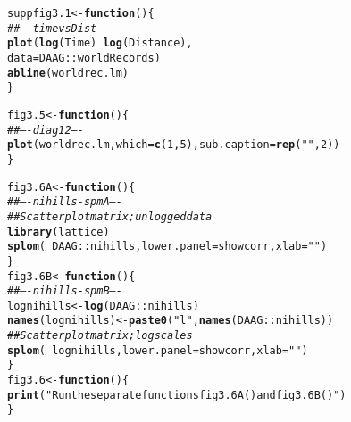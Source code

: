\documentclass[12pt, a4paper,  BCOR=8.25mm, DIV=15]{scrartcl}\usepackage[]{graphicx}\usepackage[]{color}
\makeatletter
\newcommand{\hlnum}[1]{\textcolor[rgb]{0.686,0.059,0.569}{#1}}%
\newcommand{\hlstr}[1]{\textcolor[rgb]{0.192,0.494,0.8}{#1}}%
\newcommand{\hlcom}[1]{\textcolor[rgb]{0.678,0.584,0.686}{\textit{#1}}}%
\newcommand{\hlopt}[1]{\textcolor[rgb]{0,0,0}{#1}}%
\newcommand{\hlstd}[1]{\textcolor[rgb]{0.345,0.345,0.345}{#1}}%
\newcommand{\hlkwa}[1]{\textcolor[rgb]{0.161,0.373,0.58}{\textbf{#1}}}%
\newcommand{\hlkwb}[1]{\textcolor[rgb]{0.69,0.353,0.396}{#1}}%
\newcommand{\hlkwc}[1]{\textcolor[rgb]{0.333,0.667,0.333}{#1}}%
\newcommand{\hlkwd}[1]{\textcolor[rgb]{0.737,0.353,0.396}{\textbf{#1}}}%
\newenvironment{kframe}{%
 \def\at@end@of@kframe{}%
 \ifinner\ifhmode%
  \def\at@end@of@kframe{\end{minipage}}%
  \begin{minipage}{\columnwidth}%
 \fi\fi%
 \def\FrameCommand##1{\hskip\@totalleftmargin \hskip-\fboxsep
 \colorbox{shadecolor}{##1}\hskip-\fboxsep
     \hskip-\linewidth \hskip-\@totalleftmargin \hskip\columnwidth}%
 \MakeFramed {\advance\hsize-\width
   \@totalleftmargin\z@ \linewidth\hsize
   \@setminipage}}%
 {\par\unskip\endMakeFramed%
 \at@end@of@kframe}
\newenvironment{knitrout}{}{} %
\makeatother
\begin{document}
\begin{knitrout}
\color{fgcolor}\begin{kframe}
\begin{alltt}
\hlstd{suppfig3.1} \hlkwb{<-} \hlkwa{function}\hlstd{()\{}
\hlcom{## ---- timevsDist ----}
\hlkwd{plot}\hlstd{(}\hlkwd{log}\hlstd{(Time)} \hlopt{~} \hlkwd{log}\hlstd{(Distance),}
     \hlkwc{data} \hlstd{= DAAG}\hlopt{::}\hlstd{worldRecords)}
\hlkwd{abline}\hlstd{(worldrec.lm)}
\hlstd{\}}
\end{alltt}
\end{kframe}
\end{knitrout}

\begin{knitrout}
\color{fgcolor}\begin{kframe}
\begin{alltt}
\hlstd{fig3.5} \hlkwb{<-} \hlkwa{function}\hlstd{()\{}
\hlcom{## ---- diag12 ----}
\hlkwd{plot}\hlstd{(worldrec.lm,} \hlkwc{which}\hlstd{=}\hlkwd{c}\hlstd{(}\hlnum{1}\hlstd{,}\hlnum{5}\hlstd{),} \hlkwc{sub.caption}\hlstd{=}\hlkwd{rep}\hlstd{(}\hlstr{""}\hlstd{,}\hlnum{2}\hlstd{))}
\hlstd{\}}
\end{alltt}
\end{kframe}
\end{knitrout}



\begin{knitrout}
\color{fgcolor}\begin{kframe}
\begin{alltt}
\hlstd{fig3.6A} \hlkwb{<-} \hlkwa{function}\hlstd{()\{}
\hlcom{## ---- nihills-spmA ----}
\hlcom{## Scatterplot matrix; unlogged data}
\hlkwd{library}\hlstd{(lattice)}
\hlkwd{splom}\hlstd{(}\hlopt{~}\hlstd{DAAG}\hlopt{::}\hlstd{nihills,}  \hlkwc{lower.panel}\hlstd{=showcorr,} \hlkwc{xlab}\hlstd{=}\hlstr{""}\hlstd{)}
\hlstd{\}}
\hlstd{fig3.6B} \hlkwb{<-} \hlkwa{function}\hlstd{()\{}
\hlcom{## ---- nihills-spmB ----}
\hlstd{lognihills} \hlkwb{<-} \hlkwd{log}\hlstd{(DAAG}\hlopt{::}\hlstd{nihills)}
\hlkwd{names}\hlstd{(lognihills)} \hlkwb{<-} \hlkwd{paste0}\hlstd{(}\hlstr{"l"}\hlstd{,} \hlkwd{names}\hlstd{(DAAG}\hlopt{::}\hlstd{nihills))}
\hlcom{## Scatterplot matrix; log scales}
\hlkwd{splom}\hlstd{(}\hlopt{~} \hlstd{lognihills,} \hlkwc{lower.panel}\hlstd{=showcorr,} \hlkwc{xlab}\hlstd{=}\hlstr{""}\hlstd{)}
\hlstd{\}}
\hlstd{fig3.6} \hlkwb{<-} \hlkwa{function}\hlstd{()\{}
  \hlkwd{print}\hlstd{(}\hlstr{"Run the separate functions fig3.6A() and fig3.6B()"}\hlstd{)}
\hlstd{\}}
\end{alltt}
\end{kframe}
\end{knitrout}
\end{document}

